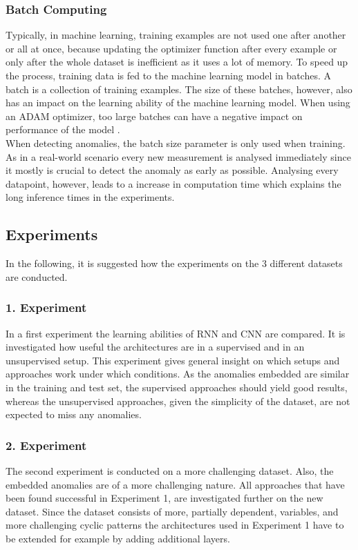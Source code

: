 \subsubsection{Batch Computing}
Typically, in machine learning, training examples are not used one after another or all at once, because updating the optimizer function after every example or only after the whole dataset is inefficient as it uses a lot of memory. To speed up the process, training data is fed to the machine learning model in batches. A batch is a collection of training examples. The size of these batches, however, also has an impact on the learning ability of the machine learning model. When using an ADAM optimizer, too large batches can have a negative impact on performance of the model \parencite{Krishnan2019}.\\
When detecting anomalies, the batch size parameter is only used when training. As in a real-world scenario every new measurement is analysed immediately since it mostly is crucial to detect the anomaly as early as possible. Analysing every datapoint, however, leads to a increase in computation time which explains the long inference times in the experiments.

\subsection{Experiments}
In the following, it is suggested how the experiments on the 3 different datasets are conducted.

\subsubsection{1. Experiment}
In a first experiment the learning abilities of RNN and CNN are compared. It is investigated how useful the architectures are in a supervised and in an unsupervised setup. This experiment gives general insight on which setups and approaches work under which conditions. As the anomalies embedded are similar in the training and test set, the supervised approaches should yield good results, whereas the unsupervised approaches, given the simplicity of the dataset, are not expected to miss any anomalies.

\subsubsection{2. Experiment}
The second experiment is conducted on a more challenging dataset. Also, the embedded anomalies are of a more challenging nature. All approaches that have been found successful in Experiment 1, are investigated further on the new dataset. Since the dataset consists of more, partially dependent, variables, and more challenging cyclic patterns the architectures used in Experiment 1 have to be extended for example by adding additional layers. 

